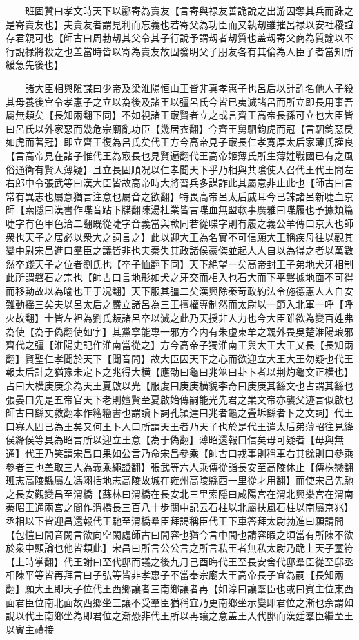 　　班固贊曰孝文時天下以酈寄為賣友【言寄與禄友善詭說之出游因奪其兵而誅之是寄賣友也】夫賣友者謂見利而忘義也若寄父為功臣而又執刼雖摧呂禄以安社稷誼存君親可也【師古曰周勃刼其父令其子行說予謂刼者刼質也盖刼寄父商為質諭以不行說禄將殺之也盖當時皆以寄為賣友故固發明父子朋友各有其倫為人臣子者當知所緩急先後也】

　　諸大臣相與隂謀曰少帝及梁淮陽恒山王皆非真孝惠子也呂后以計詐名他人子殺其母養後宫令孝惠子之立以為後及諸王以彊呂氏今皆已夷滅諸呂而所立即長用事吾屬無類矣【長知兩翻下同】不如視諸王㝡賢者立之或言齊王高帝長孫可立也大臣皆曰呂氏以外家惡而幾危宗廟亂功臣【幾居衣翻】今齊王舅駟鈞虎而冠【言駟鈞惡戾如虎而著冠】即立齊王復為呂氏矣代王方今高帝見子㝡長仁孝寛厚太后家薄氏謹良【言高帝見在諸子惟代王為㝡長也見賢遍翻代王高帝姬薄氏所生薄姓戰國已有之風俗通衛有賢人薄疑】且立長固順况以仁孝聞天下乎乃相與共隂使人召代王代王問左右郎中令張武等曰漢大臣皆故高帝時大將習兵多謀詐此其屬意非止此也【師古曰言常有異志也屬意猶言注意也屬音之欲翻】特畏高帝呂太后威耳今已誅諸呂新啑血京師【索隱曰漢書作喋音跕下牒翻陳湯杜業皆言喋血無盟㰱事廣雅曰喋履也予據類篇啑字有色甲色洽二翻既從啑字音義當與㰱同若從喋字則有履之義公羊傳曰京大也師衆也天子之居必以衆大之詞言之】此以迎大王為名實不可信願大王稱疾母往以觀其變中尉宋昌進曰羣臣之議皆非也夫秦失其政諸侯豪傑並起人人自以為得之者以萬數然卒踐天子之位者劉氏也【卒子恤翻下同】天下絶望一矣高帝封王子弟地犬牙相制此所謂磐石之宗也【師古曰言地形如犬之牙交而相入也石大而下平磐據地面不可得而移動故以為喻也王于况翻】天下服其彊二矣漢興除秦苛政約法令施德惠人人自安難動揺三矣夫以呂太后之嚴立諸呂為三王擅權專制然而太尉以一節入北軍一呼【呼火故翻】士皆左袒為劉氏叛諸呂卒以滅之此乃天授非人力也今大臣雖欲為變百姓弗為使【為于偽翻使如字】其黨寧能專一邪方今内有朱虚東牟之親外畏吳楚淮陽琅邪齊代之彊【淮陽史記作淮南當從之】方今高帝子獨淮南王與大王大王又長【長知兩翻】賢聖仁孝聞於天下【聞音問】故大臣因天下之心而欲迎立大王大王勿疑也代王報太后計之猶豫未定卜之兆得大横【應劭曰龜曰兆筮曰卦卜者以荆灼龜文正横也】占曰大横庚庚余為天王夏啟以光【服䖍曰庚庚横貌李奇曰庚庚其繇文也占謂其繇也張晏曰先是五帝官天下老則嬗賢至夏啟始傳嗣能光先君之業文帝亦襲父迹言似啟也師古曰繇丈救翻本作籕籕書也謂讀卜詞孔頴達曰兆者龜之舋坼繇者卜之文詞】代王曰寡人固已為王矣又何王卜人曰所謂天王者乃天子也於是代王遣太后弟薄昭往見絳侯絳侯等具為昭言所以迎立王意【為于偽翻】薄昭還報曰信矣毋可疑者【毋與無通】代王乃笑謂宋昌曰果如公言乃命宋昌參乘【師古曰戎事則稱車右其餘則曰參乘參者三也盖取三人為義乘繩證翻】張武等六人乘傳從詣長安至高陵休止【傳株戀翻班志高陵縣屬左馮翊括地志高陵故城在雍州高陵縣西一里從才用翻】而使宋昌先馳之長安觀變昌至渭橋【蘇林曰渭橋在長安北三里索隱曰咸陽宫在渭北興樂宫在渭南秦昭王通兩宫之間作渭橋長三百八十步關中記云石柱以北屬扶風石柱以南屬京兆】丞相以下皆迎昌還報代王馳至渭橋羣臣拜謁稱臣代王下車答拜太尉勃進曰願請間【包愷曰間音閑言欲向空閑處師古曰間容也猶今言中間也請容暇之頃當有所陳不欲於衆中顯論也他皆類此】宋昌曰所言公公言之所言私王者無私太尉乃跪上天子璽符【上時掌翻】代王謝曰至代邸而議之後九月己酉晦代王至長安舍代邸羣臣從至邸丞相陳平等皆再拜言曰子弘等皆非孝惠子不當奉宗廟大王高帝長子宜為嗣【長知兩翻】願大王即天子位代王西鄉讓者三南鄉讓者再【如淳曰讓羣臣也或曰賓主位東西面君臣位南北面故西鄉坐三讓不受羣臣猶稱宜乃更南鄉坐示變即君位之漸也余謂如說以代王南鄉坐為即君位之漸恐非代王所以再讓之意盖王入代邸而漢廷羣臣繼至王以賓主禮接